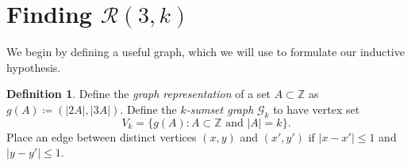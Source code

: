 \documentclass[10pt,a4paper]{article}
\theoremstyle{definition}
\newtheorem{definition}[theorem]{Definition}
\theoremstyle{remark}
\numberwithin{equation}{section}
\numberwithin{theorem}{section}
\newcommand{\Z}{\mathbb{Z}}
\newcommand{\calr}{\mathcal{R}}
\begin{document}
\section{Finding \texorpdfstring{$\calr(3,k)$}{R(3,k)}}\label{secth3}

We begin by defining a useful graph, which we will use to formulate our inductive hypothesis.

\begin{definition}
    Define the \emph{graph representation} of a set $A \subset \Z$ as $g(A)\coloneq  (|2A|,|3A|)$.
    Define the \emph{$k$-sumset graph} $\mathcal{G}_k$ to have vertex set \[ V_k = \{g(A): A \subset \Z \text{ and } |A| = k\}.\] Place an edge between distinct vertices $(x,y)$ and $(x',y')$ if $|x-x'| \leq 1$ and $|y-y'| \leq 1$.
\end{definition}
\end{document}

